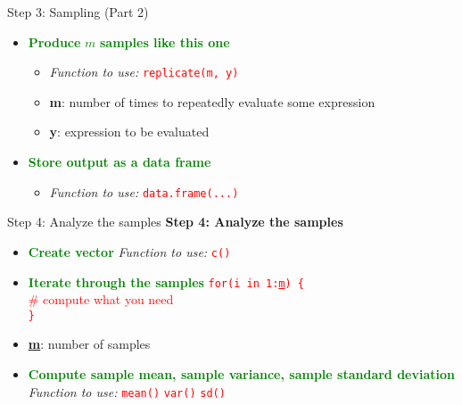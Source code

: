 \documentclass{beamer}
\begin{document}
\begin{frame}{Step 3: Sampling (Part 2)}
    \begin{itemize}
        \item \textcolor{green}{\textbf{Produce} \underline{$m$} \textbf{samples like this one}}
        \begin{itemize}
            \item \textit{Function to use:} \textcolor{red}{\texttt{replicate(m, y)}}
            \item \textbf{m}: number of times to repeatedly evaluate some expression
            \item \textbf{y}: expression to be evaluated
        \end{itemize}
        \item \textcolor{green}{\textbf{Store output as a data frame}}
        \begin{itemize}
            \item \textit{Function to use:} \textcolor{red}{\texttt{data.frame(...)}}
        \end{itemize}
    \end{itemize}
\end{frame}

\begin{frame}{Step 4: Analyze the samples}
    \textbf{Step 4: Analyze the samples}
    \begin{itemize}
        \item \textcolor{green}{\textbf{Create vector}}  
        \textit{Function to use:} \textcolor{red}{\texttt{c()}}

        \item \textcolor{green}{\textbf{Iterate through the samples}}  
        \textcolor{red}{\texttt{for(i in 1:\underline{m}) \{} \\  
        \quad \# compute what you need \\  
        \texttt{\}}}

        \item \textbf{\underline{m}}: number of samples

        \item \textcolor{green}{\textbf{Compute sample mean, sample variance, sample standard deviation}}  
        \textit{Function to use:} \textcolor{red}{\texttt{mean()} \quad \texttt{var()} \quad \texttt{sd()}}
    \end{itemize}
\end{frame}
\end{document}
